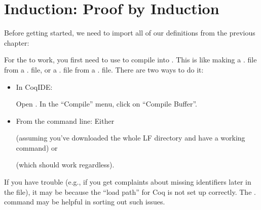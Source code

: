 \documentclass[12pt]{report}
\begin{document}

\begin{coqdoccode}
\end{coqdoccode}
\section{Induction: Proof by Induction}



 Before getting started, we need to import all of our
    definitions from the previous chapter: \begin{coqdoccode}
\coqdocemptyline
\coqdocemptyline
\end{coqdoccode}
For the   to work, you first need to use
     to compile  into .  This is like
    making a . file from a . file, or a . file from a
    . file.  There are two ways to do it:



\begin{itemize}
\item  In CoqIDE:


         Open .  In the ``Compile'' menu, click on ``Compile
         Buffer''.



\item  From the command line: Either


          


       (assuming you've downloaded the whole LF directory and have a
       working  command) or


          


       (which should work regardless).

\end{itemize}


    If you have trouble (e.g., if you get complaints about missing
    identifiers later in the file), it may be because the ``load path''
    for Coq is not set up correctly.  The  . command may
    be helpful in sorting out such issues.
\end{document}
